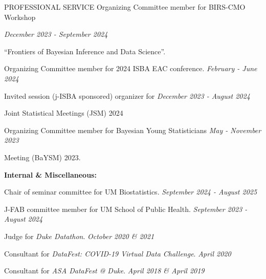 \documentclass{resume} %
\newcommand{\thisYear}[1]{
	#1
}
\begin{document}
\begin{rSection}{PROFESSIONAL SERVICE}
 Organizing Committee member for BIRS-CMO Workshop	\hfill {\em December 2023 - September 2024
 
\vspace{-0.1in}

``Frontiers of Bayesian Inference and Data Science''. 
}

 
\smallskip 
 
Organizing Committee member for 2024 ISBA EAC conference. 	\hfill {\em February - June 2024}
	
\smallskip

Invited session (j-ISBA sponsored) organizer for  \hfill  {\em December 2023 - August 2024}

\vspace{-0.1in}

Joint Statistical Meetings (JSM) 2024

\smallskip
	
Organizing Committee member for Bayesian Young Statisticians  \hfill {\em May - November 2023}

\vspace{-0.1in}
Meeting (BaYSM) 2023.


 \hspace*{-0.2in}\textbf{Internal \& Miscellaneous: }
 
 Chair of seminar committee for UM Biostatistics. \hfill {\em September 2024 - August 2025}
 
 J-FAB committee member for UM School of Public Health.  \hfill {\em September 2023 - August 2024}

Judge for \emph{Duke Datathon}.  \hfill {\em October 2020 \& 2021}







\smallskip

Consultant for \emph{DataFest: COVID-19 Virtual Data Challenge}.  \hfill {\em April 2020}



\smallskip

Consultant for \emph{ASA DataFest @ Duke}. \hfill {\em April 2018 \& April 2019}
\end{rSection}
\end{document}
